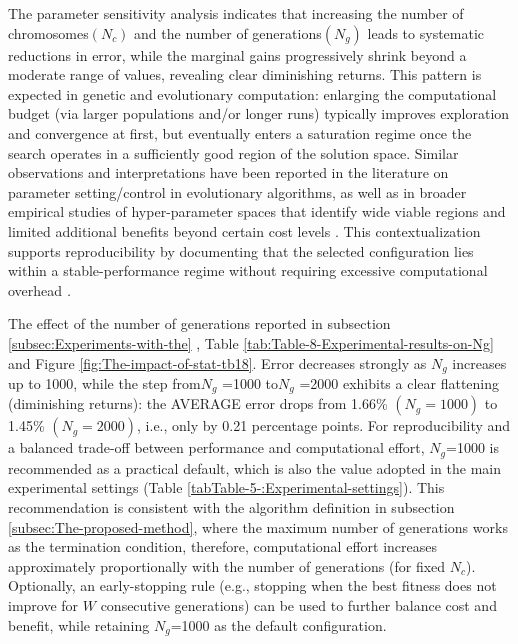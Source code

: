 \documentclass[12pt]{Definitions/academia}
\begin{document}
The parameter sensitivity analysis indicates that increasing the number
of chromosomes$(N_{c})$ and the number of generations$(N_{g})$ leads
to systematic reductions in error, while the marginal gains progressively
shrink beyond a moderate range of values, revealing clear diminishing
returns. This pattern is expected in genetic and evolutionary computation:
enlarging the computational budget (via larger populations and/or
longer runs) typically improves exploration and convergence at first,
but eventually enters a saturation regime once the search operates
in a sufficiently good region of the solution space. Similar observations
and interpretations have been reported in the literature on parameter
setting/control in evolutionary algorithms, as well as in broader
empirical studies of hyper-parameter spaces that identify wide viable
regions and limited additional benefits beyond certain cost levels
\textit{\cite{Eiben 1999,De Jong 2007,Sipper 2018,O=002019Neill 2018}}.
This contextualization supports reproducibility by documenting that
the selected configuration lies within a stable-performance regime
without requiring excessive computational overhead \textit{\cite{Mills 2014}.}

The effect of the number of generations reported in subsection \ref{subsec:Experiments-with-the}
, Table \ref{tab:Table-8-Experimental-results-on-Ng} and  Figure \ref{fig:The-impact-of-stat-tb18}.
Error decreases strongly as $N_{g}$ increases up to 1000, while the
step from$N_{g}$ =1000 to$N_{g}$ =2000 exhibits a clear flattening
(diminishing returns): the AVERAGE error drops from 1.66\% $\left(N_{g}=1000\right)$
to 1.45\% $\left(N_{g}=2000\right)$, i.e., only by 0.21 percentage
points. For reproducibility and a balanced trade-off between performance
and computational effort, $N_{g}$=1000 is recommended as a practical
default, which is also the value adopted in the main experimental
settings (Table \ref{tabTable-5-:Experimental-settings}). This recommendation
is consistent with the algorithm definition in subsection \ref{subsec:The-proposed-method},
where the maximum number of generations  works as the termination
condition, therefore, computational effort increases approximately
proportionally with the number of generations (for fixed $N_{c}$).
Optionally, an early-stopping rule (e.g., stopping when the best fitness
does not improve for $W$ consecutive generations) can be used to
further balance cost and benefit, while retaining $N_{g}$=1000 as
the default configuration.
\end{document}
